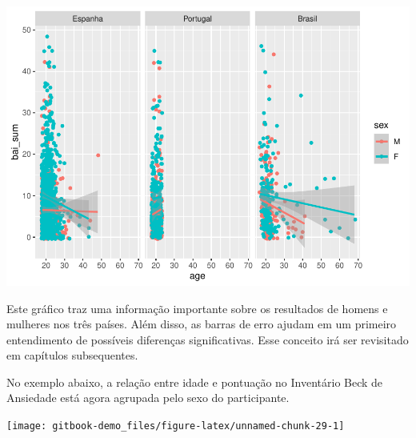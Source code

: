 \documentclass[
]{book}
\newenvironment{Shaded}{\begin{snugshade}}{\end{snugshade}}
\newcommand{\DataTypeTok}[1]{\textcolor[rgb]{0.13,0.29,0.53}{#1}}
\newcommand{\KeywordTok}[1]{\textcolor[rgb]{0.13,0.29,0.53}{\textbf{#1}}}
\newcommand{\NormalTok}[1]{#1}
\newcommand{\OperatorTok}[1]{\textcolor[rgb]{0.81,0.36,0.00}{\textbf{#1}}}
\newcommand{\StringTok}[1]{\textcolor[rgb]{0.31,0.60,0.02}{#1}}
\begin{document}
\begin{center}\includegraphics{gitbook-demo_files/figure-latex/unnamed-chunk-28-1} \end{center}

Este gráfico traz uma informação importante sobre os resultados de homens e mulheres nos três países. Além disso, as barras de erro ajudam em um primeiro entendimento de possíveis diferenças significativas. Esse conceito irá ser revisitado em capítulos subsequentes.

No exemplo abaixo, a relação entre idade e pontuação no Inventário Beck de Ansiedade está agora agrupada pelo sexo do participante.

\begin{Shaded}
\end{Shaded}

\begin{center}\texttt{[image: gitbook-demo\_files/figure-latex/unnamed-chunk-29-1]} \end{center}
\end{document}
